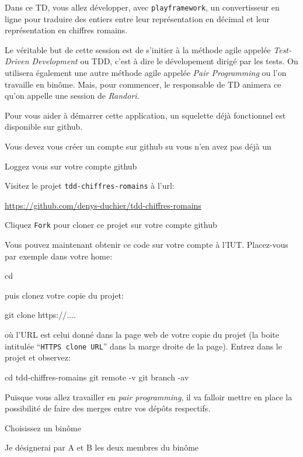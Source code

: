 \documentclass{TD}
\begin{document}
Dans ce TD, vous allez développer, avec \texttt{playframework}, un
convertisseur en ligne pour traduire des entiers entre leur représentation en
décimal et leur représentation en chiffres romains.

Le véritable but de cette session est de s'initier à la méthode agile appelée
\emph{Test-Driven Development} ou TDD, c'est à dire le dévelopement dirigé par
les tests.  On utilisera également une autre méthode agile appelée \emph{Pair
  Programming} ou l'on travaille en binôme.  Mais, pour commencer, le
responsable de TD animera ce qu'on appelle une session de \emph{Randori}.


Pour vous aider à démarrer cette application, un squelette déjà fonctionnel
est disponible sur github.
\begin{compactitem}
\item Vous devez vous créer un compte sur github su vous n'en avez pas déjà un
\item Loggez vous sur votre compte github
\item Visitez le projet \texttt{tdd-chiffres-romains} à l'url:
\begin{center}
  \url{https://github.com/denys-duchier/tdd-chiffres-romains}
\end{center}
\item Cliquez \texttt{Fork} pour cloner ce projet sur votre compte github
\end{compactitem}
Vous pouvez maintenant obtenir ce code sur votre compte à l'IUT.  Placez-vous
par exemple dans votre home:
\begin{bash}
cd
\end{bash}
puis clonez votre copie du projet:
\begin{bash}
git clone https://....
\end{bash}
où l'URL est celui donné dans la page web de votre copie du projet (la boite
intitulée ``\texttt{HTTPS clone URL}'' dans la marge droite de la page).
Entrez dans le projet et observez:
\begin{bash}
cd tdd-chiffres-romains
git remote -v
git branch -av
\end{bash}


Puisque vous allez travailler en \emph{pair programming}, il va falloir mettre
en place la possibilité de faire des merges entre vos dépôts respectifs.
\begin{compactitem}
\item Choisissez un binôme
\item Je désignerai par A et B les deux membres du binôme
\end{compactitem}
\end{document}
